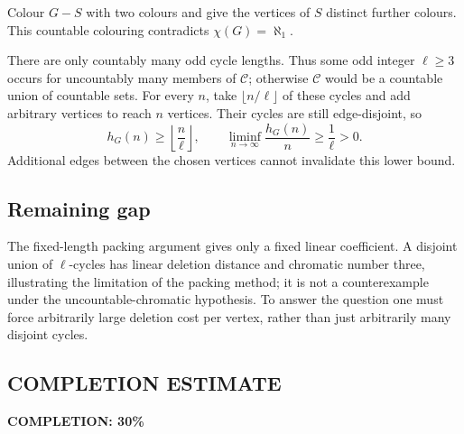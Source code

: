 Colour $G-S$ with two colours and give the vertices of $S$ distinct further colours. This countable colouring contradicts $\chi(G)=\aleph_1$.

There are only countably many odd cycle lengths. Thus some odd integer $\ell\ge3$ occurs for uncountably many members of $\mathcal C$; otherwise $\mathcal C$ would be a countable union of countable sets. For every $n$, take $\lfloor n/\ell\rfloor$ of these cycles and add arbitrary vertices to reach $n$ vertices. Their cycles are still edge-disjoint, so
\[
 h_G(n)\ge\left\lfloor\frac n\ell\right\rfloor,\qquad
 \liminf_{n\to\infty}\frac{h_G(n)}n\ge\frac1\ell>0. \tag{3}
\]
Additional edges between the chosen vertices cannot invalidate this lower bound.

\subsection*{Remaining gap}
The fixed-length packing argument gives only a fixed linear coefficient. A disjoint union of $\ell$-cycles has linear deletion distance and chromatic number three, illustrating the limitation of the packing method; it is not a counterexample under the uncountable-chromatic hypothesis. To answer the question one must force arbitrarily large deletion cost per vertex, rather than just arbitrarily many disjoint cycles.
\subsection*{COMPLETION ESTIMATE}
\textbf{COMPLETION: 30\%}
